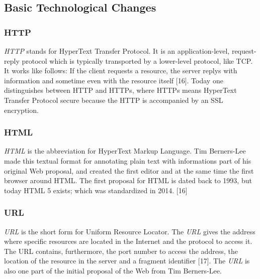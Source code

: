 \documentclass[runningheads]{llncs}
\begin{document}
			\subsection{Basic Technological Changes}
		\subsubsection{HTTP}
		\leavevmode\newline
		\textit{HTTP} stands for HyperText Transfer Protocol. It is an application-level, request-reply protocol which is typically transported by a lower-level protocol, like TCP. It works like follows: If the client requests a resource, the server replys with information and sometime even with the resource itself [16]. Today one distinguishes between HTTP and HTTPs, where HTTPs means HyperText Transfer Protocol secure because the HTTP is accompanied by an SSL encryption.
		\subsubsection{HTML}
		\leavevmode\newline
		\textit{HTML} is the abbreviation for HyperText Markup Language. Tim Berners-Lee made this textual format for annotating plain text with informations part of his original Web proposal, and created the first editor and at the same time the first browser around HTML. The first proposal for HTML is dated back to 1993, but today HTML 5 exists; which was standardized in 2014. [16]
		\subsubsection{URL}
		\leavevmode\newline
		\textit{URL} is the short form for Uniform Resource Locator. The \textit{URL} gives the address where specific resources are located in the Internet and the protocol to access it. The URL contains, furthermore, the port number to access the address, the location of the resource in the server and a fragment identifier [17]. The \textit{URL} is also one part of the initial proposal of the Web from Tim Berners-Lee.
\end{document}
